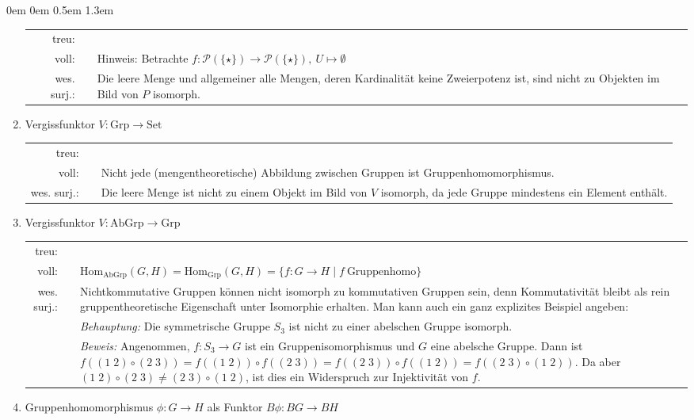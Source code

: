 \documentclass[a4paper,ngerman]{scrartcl}
\newcommand{\cmark}{\ding{51}}
\newcommand{\xmark}{\ding{55}}
\theoremstyle{definition}
\theoremstyle{plain}
\theoremstyle{remark}
\newcommand{\Hom}{\mathrm{Hom}}
\newcommand{\Set}{\mathrm{Set}}
\newcommand{\Grp}{\mathrm{Grp}}
\newcommand{\AbGrp}{\mathrm{AbGrp}}
\begin{document}
\begin{list}{}{0em \leftmargin0em \itemindent0.5em \itemsep 1.3em}
\begin{enumerate}
\setlength{\tabcolsep}{3pt}
\begin{tabular}{ r c p{12cm} }
  treu: & \cmark &\\
  voll: & \xmark & Hinweis: Betrachte $f:\mathcal{P}(\{\star\}) \to \mathcal{P}(\{\star\}),\ U \mapsto \emptyset$\\
  wes. surj.: & \xmark & Die leere Menge und allgemeiner alle Mengen, deren Kardinalität keine Zweierpotenz ist, sind nicht zu Objekten im Bild von $P$ isomorph.
\end{tabular}

\item Vergissfunktor $V : \Grp \to \Set$

\begin{tabular}{ r c p{12cm} }
  treu: & \cmark &\\
  voll: & \xmark & Nicht jede (mengentheoretische) Abbildung zwischen Gruppen ist Gruppenhomomorphismus.\\
  wes. surj.: & \xmark & Die leere Menge ist nicht zu einem Objekt im Bild von $V$ isomorph, da jede Gruppe mindestens ein Element enthält.
\end{tabular}

\item Vergissfunktor $V : \AbGrp \to \Grp$

\begin{tabular}{ r c p{12cm} }
  treu: & \cmark &\\
  voll: & \cmark &$\Hom_\AbGrp(G, H) = \Hom_\Grp(G, H) = \{ f : G \to H \mid f\ \text{Gruppenhomo} \}$\\
  wes. surj.: & \xmark & Nichtkommutative Gruppen können nicht isomorph zu kommutativen Gruppen sein, denn Kommutativität bleibt als rein gruppentheoretische Eigenschaft unter Isomorphie erhalten. Man kann auch ein ganz explizites Beispiel angeben: \\
  & & \emph{Behauptung:} Die symmetrische Gruppe $S_3$ ist nicht zu einer abelschen Gruppe isomorph.\\
  & & \emph{Beweis:} Angenommen, $f:S_3 \to G$ ist ein Gruppenisomorphismus und $G$ eine abelsche Gruppe. Dann ist $f((1\;2) \circ (2\;3)) = f((1\;2)) \circ f((2\;3)) = f((2\;3)) \circ f((1\;2)) = f((2\;3) \circ (1\;2))$. Da aber $(1\;2) \circ (2\;3) \ne (2\;3) \circ (1\;2)$, ist dies ein Widerspruch zur Injektivität von $f$.
\end{tabular}

\item Gruppenhomomorphismus $\phi : G \to H$ als Funktor $B\phi : BG \to BH$


\end{enumerate}
\end{list}
\end{document}
